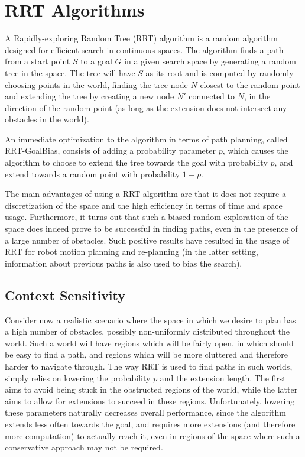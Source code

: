 \documentclass[10pt,twoside,twocolumn]{article}
\begin{document}
\section{RRT Algorithms}

A Rapidly-exploring Random Tree (RRT) algorithm is a random algorithm designed for efficient search in
continuous spaces. The algorithm finds a path from a start point $S$ to a goal $G$ in a given search space 
by generating a random tree in the space. The tree will have $S$ as its root and is computed by randomly
choosing points in the world, finding the tree node $N$ closest to the random point and extending the tree by
creating a new node $N'$ connected to $N$, in the direction of the random point (as long as the extension does not
intersect any obstacles in the world). 

An immediate optimization to the algorithm in terms of path planning, called RRT-GoalBias, consists of adding a probability
parameter $p$, which causes the algorithm to choose to extend the tree towards the goal with probability $p$,
and extend towards a random point with probability $1-p$. 

The main advantages of using a RRT algorithm are that it does not require a discretization of the space and the high
efficiency in terms of time and space usage. Furthermore, it turns out that such a biased random exploration of the space
does indeed prove to be successful in finding paths, even in the presence of a large number of obstacles. Such positive
results have resulted in the usage of RRT for robot motion planning and re-planning (in the latter setting, information
about previous paths is also used to bias the search).

\subsection{Context Sensitivity}
Consider now a realistic scenario where the space in which we desire to plan has a high number of obstacles, possibly 
non-uniformly distributed throughout the world.
Such a world will have regions which will be fairly open, in which should be easy to find a path, and regions which will
be more cluttered and therefore harder to navigate through. The way RRT is used to find paths in such worlds, simply relies
on lowering the probability $p$ and the extension length. The first aims to avoid being stuck in the obstructed regions of the world,
while the latter aims to allow for extensions to succeed in these regions. Unfortunately, lowering these parameters naturally
decreases overall performance, since the algorithm extends less often towards the goal, and requires more extensions 
(and therefore more computation) to actually reach it, even in regions of the space where such a conservative approach may not be required.
\end{document}
